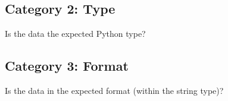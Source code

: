\subsection*{Category 2: Type}\label{31-input-handling:category-2-type}

Is the data the expected Python type?

\begin{codebox}[short]

\begin{Shaded}
\begin{Highlighting}[]
\OperatorTok{=}\NormalTok{)}

  \NormalTok{):}
    \NormalTok{: }\NormalTok{\}), }
\end{Highlighting}
\end{Shaded}

\end{codebox}

\subsection*{Category 3: Format}\label{31-input-handling:category-3-format}

Is the data in the expected format (within the string type)?


